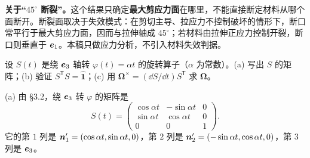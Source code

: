 \documentclass[11pt]{ctexart}
\newcommand{\ten}[1]{\mathbf{#1}}
\newcommand{\unitd}{\hat{\ten{1}}}
\begin{document}
\textbf{关于“$45^\circ$ 断裂”。}这个结果只确定\textbf{最大剪应力面}在哪里，不能直接断定材料从哪个面断开。断裂面取决于失效模式：在剪切主导、拉应力不控制破坏的情形下，断口常平行于最大剪应力面，因而与拉伸轴成 $45^\circ$；若材料由拉伸正应力控制开裂，断口则垂直于 $\boldsymbol{e}_1$。本稿只做应力分析，不引入材料失效判据。

{设 $S(t)$ 是绕 $\boldsymbol{e}_3$ 轴转 $\varphi(t)=\alpha t$ 的旋转算子（$\alpha$ 为常数）。(a) 写出 $S$ 的矩阵；(b) 验证 $S^{\mathsf T}S=\unitd$；(c) 用 $\boldsymbol\Omega^{\times}=(\dd S/\dd t)S^{\mathsf T}$ 求 $\boldsymbol\Omega$。}

(a) 由 \S3.2，绕 $\boldsymbol{e}_3$ 转 $\varphi$ 的矩阵是
\[
S(t)=
\begin{pmatrix}
\cos\alpha t&-\sin\alpha t&0\\
\sin\alpha t&\cos\alpha t&0\\
0&0&1
\end{pmatrix}.
\]
它的第 $1$ 列是 $\boldsymbol{n}'_1=(\cos\alpha t,\sin\alpha t,0)$，第 $2$ 列是 $\boldsymbol{n}'_2=(-\sin\alpha t,\cos\alpha t,0)$，第 $3$ 列是 $\boldsymbol{e}_3$。
\end{document}
